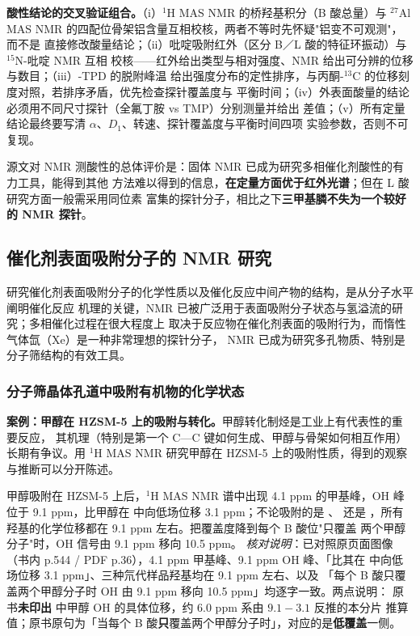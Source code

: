 \begin{crosscheck}
\textbf{酸性结论的交叉验证组合。}（i）$^{1}$H MAS NMR 的桥羟基积分（B 酸总量）与
$^{27}$Al MAS NMR 的四配位骨架铝含量互相校核，两者不等时先怀疑"铝变不可观测"，而不是
直接修改酸量结论；（ii）吡啶吸附红外（区分 B／L 酸的特征环振动）与 $^{15}$N-吡啶 NMR 互相
校核——红外给出类型与相对强度、NMR 给出可分辨的位移与数目；（iii）-TPD 的脱附峰温
给出强度分布的定性排序，与丙酮-$^{13}$C 的位移刻度对照，若排序矛盾，优先检查探针覆盖度与
平衡时间；（iv）外表面酸量的结论必须用不同尺寸探针（全氟丁胺 vs TMP）分别测量并给出
差值；（v）所有定量结论最终要写清 $\alpha$、$D_1$、转速、探针覆盖度与平衡时间四项
实验参数，否则不可复现。
\end{crosscheck}

源文对 NMR 测酸性的总体评价是：固体 NMR 已成为研究多相催化剂酸性的有力工具，能得到其他
方法难以得到的信息，\textbf{在定量方面优于红外光谱}；但在 L 酸研究方面一般需采用同位素
富集的探针分子，相比之下\textbf{三甲基膦不失为一个较好的 NMR 探针}。

\subsection{催化剂表面吸附分子的 NMR 研究}
\label{sec:adsorbed}

研究催化剂表面吸附分子的化学性质以及催化反应中间产物的结构，是从分子水平阐明催化反应
机理的关键，NMR 已被广泛用于表面吸附分子状态与氢溢流的研究；多相催化过程在很大程度上
取决于反应物在催化剂表面的吸附行为，而惰性气体氙（Xe）是一种非常理想的探针分子，
 NMR 已成为研究多孔物质、特别是分子筛结构的有效工具。

\subsubsection{分子筛晶体孔道中吸附有机物的化学状态}
\label{sec:methanol}

\textbf{案例：甲醇在 HZSM-5 上的吸附与转化。}甲醇转化制烃是工业上有代表性的重要反应，
其机理（特别是第一个 C—C 键如何生成、甲醇与骨架如何相互作用）长期有争议。用
$^{1}$H MAS NMR 研究甲醇在 HZSM-5 上的吸附性质，得到的观察与推断可以分开陈述。

\begin{obs}
甲醇吸附在 HZSM-5 上后，$^{1}$H MAS NMR 谱中出现 4.1 ppm 的甲基峰，OH 峰位于
9.1 ppm，比甲醇在  中向低场位移 3.1 ppm；不论吸附的是 、
还是 ，所有羟基的化学位移都在 9.1 ppm 左右。把覆盖度降到每个 B 酸位"只覆盖
两个甲醇分子"时，OH 信号由 9.1 ppm 移向 10.5 ppm。
\emph{核对说明}：已对照原页面图像（书内 p.544 / PDF p.36），4.1 ppm 甲基峰、9.1 ppm OH
峰、「比其在  中向低场位移 3.1 ppm」、三种氘代样品羟基均在 9.1 ppm 左右、以及
「每个 B 酸只覆盖两个甲醇分子时 OH 由 9.1 ppm 移向 10.5 ppm」均逐字一致。两点说明：
原书\textbf{未印出}  中甲醇 OH 的具体位移，约 6.0 ppm 系由 $9.1-3.1$ 反推的本分片
推算值；原书原句为「当每个 B 酸\textbf{只}覆盖两个甲醇分子时」，对应的是\textbf{低覆盖}一侧。
\end{obs}

